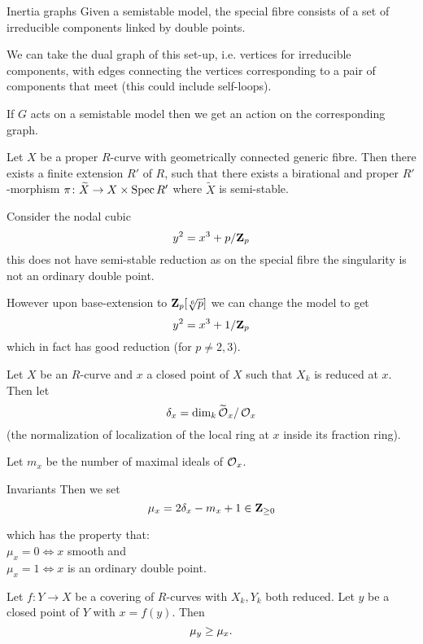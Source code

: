 \begin{frame}{Inertia graphs}
    Given a semistable model, the special fibre consists of a set of irreducible components linked by double points.

    We can take the dual graph of this set-up, i.e. vertices for irreducible components, with edges connecting the vertices corresponding to a pair of components that meet (this could include self-loops).

    If $G$ acts on a semistable model then we get an action on the corresponding graph.
\end{frame}

\begin{frame}
    \begin{theorem}
        Let $X$ be a proper $R$-curve with geometrically connected generic fibre. Then there exists a finite extension $R'$ of $R$, such that there exists a birational and proper $R'$-morphism $\pi  \colon  \widetilde X \to X \times \operatorname{Spec} R'$ where $\widetilde X$ is semi-stable.
    \end{theorem}\pause
    \begin{example}
        Consider the nodal cubic
        $$ y^2 = x^3 + p /\mathbf{Z}_p$$
        this does not have semi-stable reduction as on the special fibre the singularity is not an ordinary double point.

        However upon base-extension to $\mathbf{Z}_p[ \sqrt[6]{p}] $ we can change the model to get
        $$ y^2 = x^3 + 1 /\mathbf{Z}_p$$
        which in fact has good reduction (for $p \ne 2,3$).
    \end{example}
    \end{frame}\begin{frame}
    Let $X$ be an $R$-curve and $x$ a closed point of $X$ such that $X_k$ is reduced at $x$. Then let
    $$ \delta _x = \dim_k \widetilde {\operatorname{\mathcal{O}}}_x/\operatorname{\mathcal{O}}_x $$
    (the normalization of localization of the local ring at $x$ inside its fraction ring).\pause

    Let $m _x$ be the number of maximal ideals of $\operatorname{\mathcal{O}}_x$.\pause
    \end{frame}\begin{frame}{Invariants}
    Then we set
    $$ \mu _x =  2\delta _x - m_x + 1 \in \mathbf{Z}_{\ge 0} $$

    which has the property that:\\ $\mu _x = 0 \iff x$ smooth and\\ $\mu _x  = 1 \iff x $ is  an ordinary double point. \pause

    \begin{proposition}
        Let $f\colon Y \to X$  be a covering of $R$-curves with $X_k,Y_k$ both reduced. Let $y$ be a closed point of $Y$ with $x = f(y)$. Then 
        $$ \mu _y \ge \mu _x\text. $$
    \end{proposition}
\end{frame}

